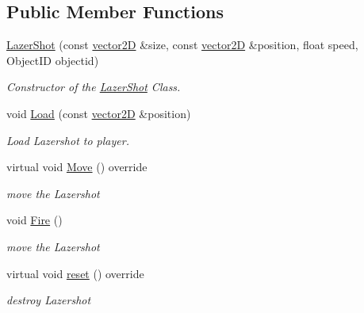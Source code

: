 \subsection*{Public Member Functions}
\begin{DoxyCompactItemize}
\item 
\mbox{\hyperlink{class_lazer_shot_a16416eaac233433aae4e95edb48b129d}{Lazer\+Shot}} (const \mbox{\hyperlink{classvector2_d}{vector2D}} \&size, const \mbox{\hyperlink{classvector2_d}{vector2D}} \&position, float speed, Object\+ID objectid)
\begin{DoxyCompactList}\small\item\em Constructor of the \mbox{\hyperlink{class_lazer_shot}{Lazer\+Shot}} Class. \end{DoxyCompactList}\item 
void \mbox{\hyperlink{class_lazer_shot_a361cd2740db7f69f92a4938c06e5e46c}{Load}} (const \mbox{\hyperlink{classvector2_d}{vector2D}} \&position)
\begin{DoxyCompactList}\small\item\em Load Lazershot to player. \end{DoxyCompactList}\item 
\mbox{\label{class_lazer_shot_a7f41ca3cb80b80c1eacea35c2d3f0d61}} 
virtual void \mbox{\hyperlink{class_lazer_shot_a7f41ca3cb80b80c1eacea35c2d3f0d61}{Move}} () override
\begin{DoxyCompactList}\small\item\em move the Lazershot \end{DoxyCompactList}\item 
\mbox{\label{class_lazer_shot_aee471cae1fb2ac98db353812d8b4f812}} 
void \mbox{\hyperlink{class_lazer_shot_aee471cae1fb2ac98db353812d8b4f812}{Fire}} ()
\begin{DoxyCompactList}\small\item\em move the Lazershot \end{DoxyCompactList}\item 
\mbox{\label{class_lazer_shot_aa45b3c708990784379403fea5f1c7b1d}} 
virtual void \mbox{\hyperlink{class_lazer_shot_aa45b3c708990784379403fea5f1c7b1d}{reset}} () override
\begin{DoxyCompactList}\small\item\em destroy Lazershot \end{DoxyCompactList}\item 

\end{DoxyCompactItemize}
